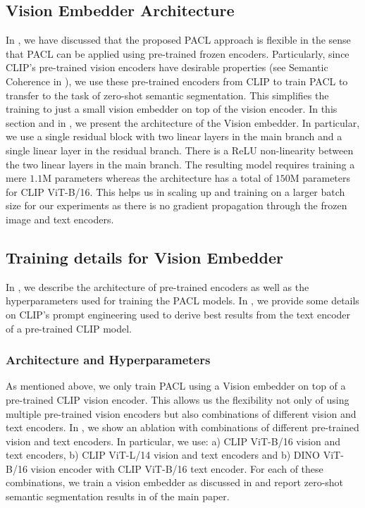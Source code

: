 \documentclass[10pt,twocolumn,letterpaper]{article}
\begin{document}
\subsection {Vision Embedder Architecture}
\label{app:vision_embedder_architecture}

In , we have discussed that the proposed PACL approach is flexible in the sense that PACL can be applied using pre-trained frozen encoders. Particularly, since CLIP's pre-trained vision encoders have desirable properties (see Semantic Coherence in ), we use these pre-trained encoders from CLIP to train PACL to transfer to the task of zero-shot semantic segmentation. This simplifies the training to just a small vision embedder on top of the vision encoder. In this section and in , we present the architecture of the Vision embedder. In particular, we use a single residual block with two linear layers in the main branch and a single linear layer in the residual branch. There is a ReLU non-linearity between the two linear layers in the main branch. The resulting model requires training a mere $1.1$M parameters whereas the architecture has a total of $150$M parameters for CLIP ViT-B/16. This helps us in scaling up and training on a larger batch size for our experiments as there is no gradient propagation through the frozen image and text encoders.

\subsection {Training details for Vision Embedder}
\label{app:training_details}

In , we describe the architecture of pre-trained encoders as well as the hyperparameters used for training the PACL models. In , we provide some details on CLIP's prompt engineering used to derive best results from the text encoder of a pre-trained CLIP model.

\subsubsection{Architecture and Hyperparameters}
\label{app:architecture_hypers}

As mentioned above, we only train PACL using a Vision embedder on top of a pre-trained CLIP vision encoder. This allows us the flexibility not only of using multiple pre-trained vision encoders but also combinations of different vision and text encoders. In , we show an ablation with combinations of different pre-trained vision and text encoders. In particular, we use: a) CLIP ViT-B/16 vision and text encoders, b) CLIP ViT-L/14 vision and text encoders and b) DINO ViT-B/16 vision encoder with CLIP ViT-B/16 text encoder. For each of these combinations, we train a vision embedder as discussed in  and report zero-shot semantic segmentation results in  of the main paper.
\end{document}
